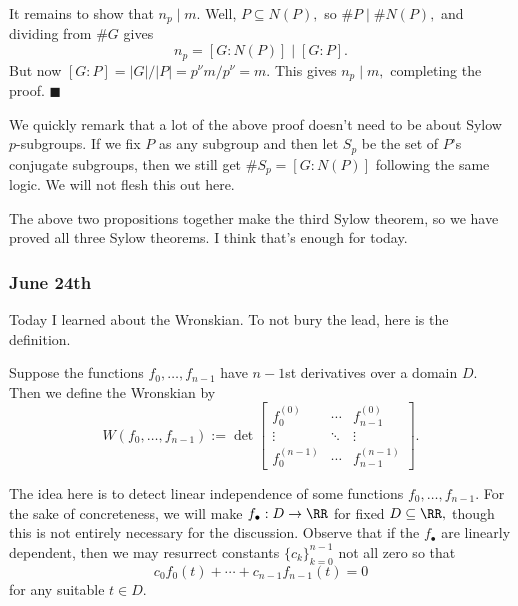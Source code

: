 It remains to show that $n_p\mid m.$ Well, $P\subseteq N(P),$ so $\#P\mid\#N(P),$ and dividing from $\#G$ gives
\[n_p=[G:N(P)]\mid[G:P].\]
But now $[G:P]=|G|/|P|=p^\nu m/p^\nu=m.$ This gives $n_p\mid m,$ completing the proof. $\blacksquare$

We quickly remark that a lot of the above proof doesn't need to be about Sylow $p$-subgroups. If we fix $P$ as any subgroup and then let $S_p$ be the set of $P$'s conjugate subgroups, then we still get $\#S_p=[G:N(P)]$ following the same logic. We will not flesh this out here.

The above two propositions together make the third Sylow theorem, so we have proved all three Sylow theorems. I think that's enough for today.

\subsubsection{June 24th}
Today I learned about the Wronskian. To not bury the lead, here is the definition.
\begin{definition}
    Suppose the functions $f_0,\ldots,f_{n-1}$ have $n-1$st derivatives over a domain $D.$ Then we define the Wronskian by
    \[W(f_0,\ldots,f_{n-1}):=\det\begin{bmatrix}
        f_0^{(0)} & \cdots & f_{n-1}^{(0)} \\
        \vdots & \ddots & \vdots \\
        f_0^{(n-1)} & \cdots & f_{n-1}^{(n-1)}
    \end{bmatrix}.\]
\end{definition}
The idea here is to detect linear independence of some functions $f_0,\ldots,f_{n-1}.$ For the sake of concreteness, we will make $f_\bullet:D\to\RR$ for fixed $D\subseteq\RR,$ though this is not entirely necessary for the discussion. Observe that if the $f_\bullet$ are linearly dependent, then we may resurrect constants $\{c_k\}_{k=0}^{n-1}$ not all zero so that
\[c_0f_0(t)+\cdots+c_{n-1}f_{n-1}(t)=0\]
for any suitable $t\in D.$

